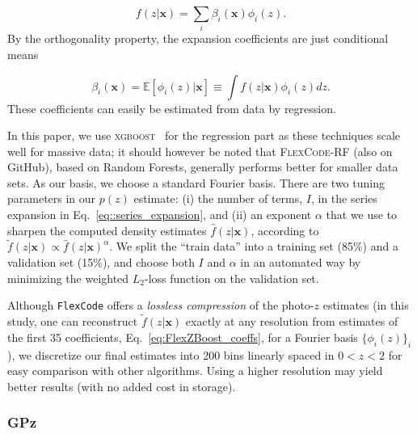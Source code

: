 \documentclass[usenatbib]{mn2e}
\newcommand{\red}[1]{\textcolor{red}{#1}}
\def\x{{\mathbf{x}}}
\begin{document}
\begin{equation}
f(z|\x)=\sum_{i}\beta_{i }(\x)\phi_i(z). \label{eq::series_expansion}
\end{equation}
By the orthogonality property, the expansion coefficients are just conditional means 

\begin{equation}
\beta_{i }(\x) =  \mathbb{E}\left[\phi_i(z)|\x\right] \equiv \int f(z|\x)   \phi_i(z) dz. \label{eq:FlexZBoost_coeffs}
\end{equation}
These coefficients can easily be estimated from data by regression. 

In this paper, we use \textsc{xgboost}~\citep{Chen:16} for the regression part as these techniques scale well for massive data; it should however be noted that \textsc{FlexCode-RF} (also on GitHub), based on Random Forests, generally performs better for smaller data sets. As our basis, we choose a standard Fourier basis. There are two tuning parameters in our $p(z)$ estimate: (i) the number of terms, $I$, in the series expansion in Eq.~\ref{eq::series_expansion}, and (ii) an exponent $\alpha$ that we use to sharpen the computed density estimates $\widehat{f}(z|\x)$, according to $\widetilde{f}(z|\x) \propto \widehat{f}(z|\x)^\alpha$. We split the ``train data'' into a training set (85\%) and a validation set (15\%), and choose both $I$ and $\alpha$ in an automated way by minimizing the weighted $L_2$-loss function \citep[Eq. 5 in][]{Izbicki:17} on the  validation set. 

Although {\tt FlexCode} offers a {\em lossless compression} of the photo-$z$ estimates (in this study, one can reconstruct $\widetilde{f}(z|\x)$ exactly at any resolution from estimates of the first 35 coefficients, Eq.~\ref{eq:FlexZBoost_coeffs}, for a Fourier basis $\{\phi_i(z)\}_{i}$), we discretize our final estimates into 200 bins linearly spaced in $0 < z < 2$ for easy comparison with other algorithms. Using a higher resolution may yield better results (with no added cost in storage).




%
%

\subsubsection{GPz}
\label{sec:gpz}
\end{document}
